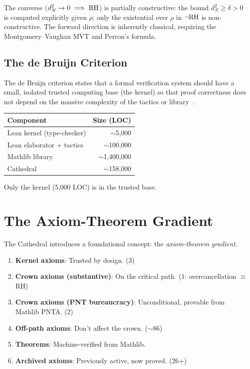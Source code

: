 \documentclass[11pt,a4paper]{article}
\begin{document}
The converse ($d_N^2 \to 0 \implies \mathrm{RH}$) is partially constructive:
the bound $d_N^2 \geq \delta > 0$ is computed explicitly given
$\rho$; only the existential over $\rho$ in $\neg\mathrm{RH}$ is
non-constructive. The forward direction is inherently classical,
requiring the Montgomery--Vaughan MVT and Perron's formula.

\subsection{The de Bruijn Criterion}

The de Bruijn criterion states that a formal verification system
should have a small, isolated trusted computing base (the kernel)
so that proof correctness does not depend on the massive complexity
of the tactics or library~\cite{debruijn1970}.

\begin{center}
\begin{tabular}{@{}lr@{}}
\toprule
\textbf{Component} & \textbf{Size (LOC)} \\
\midrule
Lean kernel (type-checker) & $\sim$5{,}000 \\
Lean elaborator + tactics & $\sim$100{,}000 \\
Mathlib library & $\sim$1{,}400{,}000 \\
Cathedral & $\sim$158{,}000 \\
\bottomrule
\end{tabular}
\end{center}

Only the kernel (5{,}000 LOC) is in the trusted base.

\section{The Axiom-Theorem Gradient}
\label{sec:gradient}

The Cathedral introduces a foundational concept: the
\emph{axiom-theorem gradient}.

\begin{enumerate}
  \item \textbf{Kernel axioms}: Trusted by design. (3)
  \item \textbf{Crown axioms (substantive)}: On the critical path. (1: overcancellation $\equiv$ RH)
  \item \textbf{Crown axioms (PNT bureaucracy)}: Unconditional,
    provable from Mathlib PNTA. (2)
  \item \textbf{Off-path axioms}: Don't affect the crown. ($\sim$86)
  \item \textbf{Theorems}: Machine-verified from Mathlib.
  \item \textbf{Archived axioms}: Previously active, now proved. (26+)
\end{enumerate}
\end{document}
